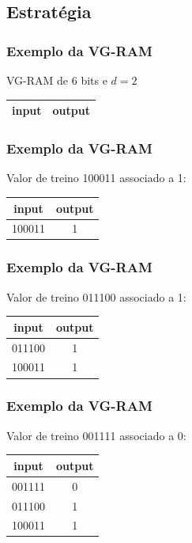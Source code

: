 \documentclass{beamer}
\begin{document}
\subsection{Estratégia}
\begin{frame}
    \frametitle{Exemplo da VG-RAM}
    VG-RAM de 6 bits e $d = 2$
    \begin{table}
        \centering
        \begin{tabular}{|c|c|}
            \hline
            input & output\\
            \hline
        \end{tabular}
    \end{table}
\end{frame}
\begin{frame}
    \frametitle{Exemplo da VG-RAM}
    Valor de treino 100011 associado a 1:
    \begin{table}
        \centering
        \begin{tabular}{|c|c|}
            \hline
             input &   output\\
            \hline
            100011 & \alert 1\\
            \hline
        \end{tabular}
    \end{table}
\end{frame}
\begin{frame}
    \frametitle{Exemplo da VG-RAM}
    Valor de treino 011100 associado a 1:
    \begin{table}
        \centering
        \begin{tabular}{|c|c|}
            \hline
            input &   output\\
            \hline
            011100 & \alert 1\\
            \hline
            100011 &        1\\
            \hline
        \end{tabular}
    \end{table}
\end{frame}
\begin{frame}
    \frametitle{Exemplo da VG-RAM}
    Valor de treino 001111 associado a 0:
    \begin{table}
        \centering
        \begin{tabular}{|c|c|}
            \hline
            input &   output\\
            \hline
            001111 & \alert 0\\
            \hline
            011100 &        1\\
            \hline
            100011 &        1\\
            \hline
        \end{tabular}
    \end{table}
\end{frame}
\end{document}
